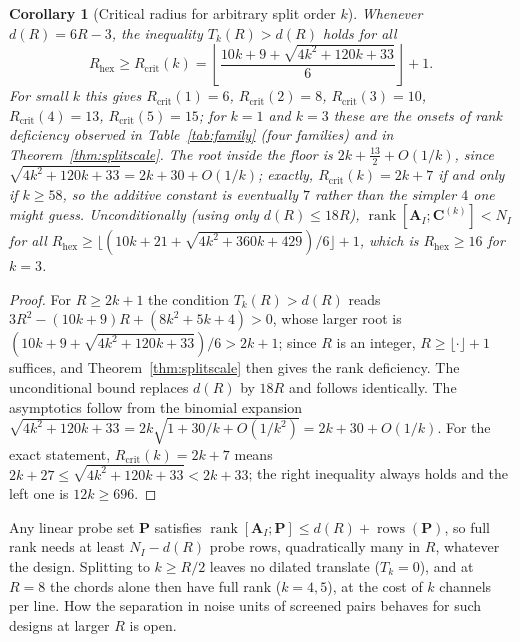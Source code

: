 \documentclass[11pt,a4paper]{article}
\newtheorem{corollary}[theorem]{Corollary}
\theoremstyle{definition}
\theoremstyle{remark}
\begin{document}
\begin{corollary}[Critical radius for arbitrary split order $k$]\label{cor:rcrit}
Whenever $d(R) = 6R - 3$, the inequality $T_k(R) > d(R)$ holds for all
\begin{equation}
R_{\text{hex}} \ge R_{\text{crit}}(k) = \left\lfloor \frac{10k + 9 + \sqrt{4k^2 + 120k + 33}}{6} \right\rfloor + 1.
\end{equation}
For small $k$ this gives $R_{\text{crit}}(1)=6$, $R_{\text{crit}}(2)=8$,
$R_{\text{crit}}(3)=10$, $R_{\text{crit}}(4)=13$, $R_{\text{crit}}(5)=15$;
for $k=1$ and $k=3$ these are the onsets of rank deficiency observed in
Table~\ref{tab:family} (four families) and in Theorem~\ref{thm:splitscale}.
The root inside the floor is $2k + \tfrac{13}{2} + O(1/k)$, since
$\sqrt{4k^2 + 120k + 33} = 2k + 30 + O(1/k)$; exactly, $R_{\text{crit}}(k) = 2k + 7$
if and only if $k \ge 58$, so the additive constant is eventually $7$ rather
than the simpler $4$ one might guess.
Unconditionally (using only $d(R) \le 18R$),
$\operatorname{rank}[\mathbf{A}_I;\mathbf{C}^{(k)}] < N_I$ for all
$R_{\text{hex}} \ge \lfloor (10k + 21 + \sqrt{4k^2 + 360k + 429})/6 \rfloor + 1$,
which is $R_{\text{hex}}\ge16$ for $k=3$.
\end{corollary}
\begin{proof}
For $R\ge2k+1$ the condition $T_k(R) > d(R)$ reads $3R^2 - (10k+9)R + (8k^2+5k+4) > 0$,
whose larger root is $(10k+9+\sqrt{4k^2+120k+33})/6 > 2k+1$; since $R$ is an integer,
$R \ge \lfloor \cdot \rfloor + 1$ suffices, and Theorem~\ref{thm:splitscale} then gives the rank deficiency. The unconditional bound replaces
$d(R)$ by $18R$ and follows identically. The asymptotics follow from the
binomial expansion $\sqrt{4k^2+120k+33} = 2k\sqrt{1+30/k+O(1/k^2)} = 2k+30+O(1/k)$.
For the exact statement, $R_{\text{crit}}(k)=2k+7$ means $2k+27\le\sqrt{4k^2+120k+33}<2k+33$; the right inequality always holds and the left one is $12k\ge696$.
\end{proof}
Any linear probe set $\mathbf{P}$ satisfies $\operatorname{rank}[\mathbf{A}_I;\mathbf{P}]\le d(R)+\operatorname{rows}(\mathbf{P})$, so full rank needs at least $N_I-d(R)$ probe rows, quadratically many in $R$, whatever the design. Splitting to $k\ge R/2$ leaves no dilated translate ($T_k = 0$), and at $R = 8$ the chords alone then have full rank ($k = 4, 5$), at the cost of $k$ channels per line. How the separation in noise units of screened pairs behaves for such designs at larger $R$ is open.
\end{document}

